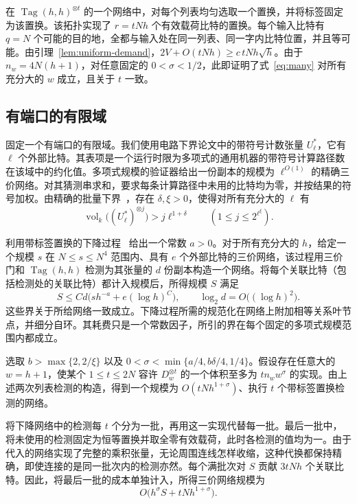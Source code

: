 在 \(\operatorname{Tag}(h,h)^{\otimes t}\) 的一个网络中，对每个列表均匀选取一个置换，并将标签固定为该置换。该拓扑实现了 \(r=tNh\) 个有效载荷比特的置换。每个输入比特有 \(q=N\) 个可能的目的地，全都与输入处在同一列表、同一字内比特位置，并且等可能。由引理~\ref{lem:uniform-demand}，\(2V+O(tNh)\ge c\,tNh\sqrt h\)。由于 \(n_w=4N(h+1)\)，对任意固定的 \(0<\sigma<1/2\)，此即证明了式~\eqref{eq:many} 对所有充分大的 \(w\) 成立，且关于 \(t\) 一致。

\subsection{有端口的有限域}

固定一个有端口的有限域。我们使用电路下界论文中的带符号计数张量 \(U_\ell^*\)，它有 \(\ell\) 个外部比特。其表项是一个运行时限为多项式的通用机器的带符号计算路径数在该域中的约化值。多项式规模的验证器给出一份副本的规模为 \(\ell^{O(1)}\) 的精确三价网络。对其猜测串求和，要求每条计算路径中未用的比特均为零，并按结果的符号加权。由精确的批量下界~\cite[定理~]{oaP}，存在 \(\delta,\xi>0\)，使得对所有充分大的 \(\ell\) 有
\[
       \operatorname{vol}_k\bigl((U_\ell^*)^{\otimes j}\bigr)
              >j\ell^{1+\delta}
       \qquad (1\le j\le 2^{\ell^\xi}).
\]

利用带标签置换的下降过程~\cite[命题~]{oaG} 给出一个常数 \(a>0\)。对于所有充分大的 \(h\)，给定一个规模 \(s\) 在 \(N\le s\le N^4\) 范围内、具有 \(e\) 个外部比特的三价网络，该过程用三价门和 \(\operatorname{Tag}(h,h)\) 检测为其张量的 \(d\) 份副本构造一个网络。将每个关联比特（包括检测处的关联比特）都计入规模后，所得规模 \(S\) 满足
\[
            S\le C d\bigl(sh^{-a}+e(\log h)^C\bigr),
           \qquad \log_2 d=O\bigl((\log h)^2\bigr).
\]
这些界关于所给网络一致成立。下降过程所需的规范化在网络上附加相等关系叶节点，并细分自环。其耗费只是一个常数因子，所引的界在每个固定的多项式规模范围内都成立。

选取 \(b>\max\{2,2/\xi\}\) 以及 \(0<\sigma<\min\{a/4,b\delta/4,1/4\}\)。假设存在任意大的 \(w=h+1\)，使某个 \(1\le t\le 2N\) 容许 \(D_w^{\otimes t}\) 的一个体积至多为 \(tn_w w^\sigma\) 的实现。由上述两次列表检测的构造，得到一个规模为 \(O(tNh^{1+\sigma})\)、执行 \(t\) 个带标签置换检测的网络。

将下降网络中的检测每 \(t\) 个分为一批，再用这一实现代替每一批。最后一批中，将未使用的检测固定为恒等置换并取全零有效载荷，此时各检测的值均为一。由于代入的网络实现了完整的乘积张量，无论周围连线怎样收缩，这种代换都保持精确，即使连接的是同一批次内的检测亦然。每个满批次对 \(S\) 贡献 \(3tNh\) 个关联比特。因此，将最后一批的成本单独计入，所得三价网络规模为
\[
                     O\bigl(h^\sigma S+tNh^{1+\sigma}\bigr).
\]

